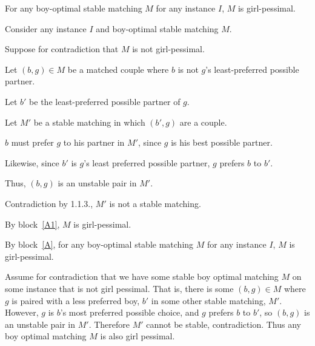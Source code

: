 \documentclass[11pt]{article}
\begin{document}
\begin{problems}


  \problem %

  \begin{lemma}
    For any boy-optimal stable matching $M$ for any instance $I$,  $M$ is girl-pessimal.
  \end{lemma}
  \begin{longFormProof}
    \begin{block}[A]
      {Consider any instance $I$ and boy-optimal stable matching $M$.}

      \begin{block}[A1]
        {Suppose for contradiction that $M$ is not girl-pessimal.}

        \step Let $(b,g)\in M$ be a matched couple where $b$ is not $g$'s least-preferred possible partner. 

        \step Let $b'$ be the least-preferred possible partner of $g$.

        \step Let $M'$ be a stable matching in which $(b',g)$ are a couple.

        \step $b$ must prefer $g$ to his partner in $M'$, since $g$ is his best possible partner.

        \step Likewise, since $b'$ is $g$'s least preferred possible partner, $g$ prefers $b$ to $b'$.

        \step Thus, $(b, g)$ is an unstable pair in $M'$.

        \step Contradiction by 1.1.3., $M'$ is not a stable matching.
      \end{block}

      \step By block~\ref{A1}, $M$ is girl-pessimal. 
    \end{block}

    \step By block~\ref{A}, for any boy-optimal stable matching $M$ for any instance $I$,
    $M$ is girl-pessimal. 

  \end{longFormProof}

  \begin{shortFormProof}
    Assume for contradiction that we have some stable boy optimal matching $M$ on some instance 
    that is not girl pessimal. That is, there is some $(b, g)\in M$ where $g$ is paired with 
    a less preferred boy, $b'$ in some other stable matching, $M'$. However, $g$ is $b$'s most 
    preferred possible choice, and $g$ prefers $b$ to $b'$, so $(b, g)$ is an unstable pair in $M'$. 
    Therefore $M'$ cannot be stable, contradiction. Thus any boy optimal matching $M$ is also girl pessimal.
  \end{shortFormProof}


\end{problems}
\end{document}
